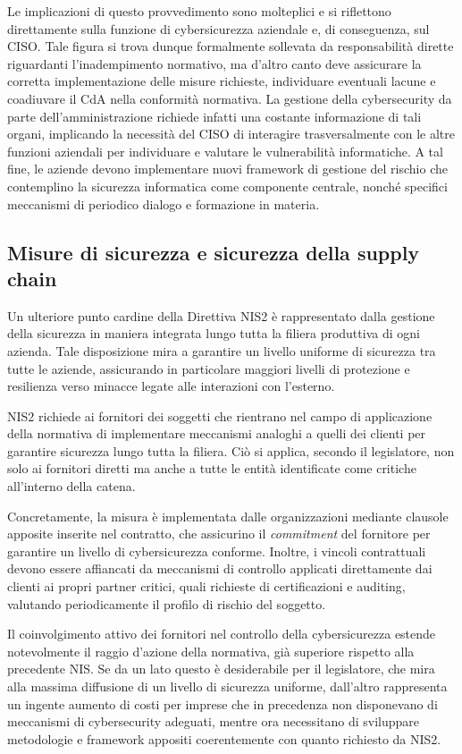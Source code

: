 Le implicazioni di questo provvedimento sono molteplici e si riflettono direttamente sulla funzione
di cybersicurezza aziendale e, di conseguenza, sul CISO. Tale figura si trova dunque formalmente 
sollevata da responsabilità dirette riguardanti l'inadempimento normativo, ma d'altro canto deve
assicurare la corretta implementazione delle misure richieste, individuare eventuali lacune e
coadiuvare il CdA nella conformità normativa. La gestione della cybersecurity
da parte dell'amministrazione richiede infatti una costante informazione di tali organi, implicando la 
necessità del CISO di interagire trasversalmente con le altre funzioni aziendali per individuare e 
valutare le vulnerabilità informatiche. A tal fine, le aziende devono implementare nuovi framework
di gestione del rischio che contemplino la sicurezza informatica come componente centrale, nonché 
specifici meccanismi di periodico dialogo e formazione in materia.


\subsection{Misure di sicurezza e sicurezza della supply chain}
Un ulteriore punto cardine della Direttiva NIS2 è rappresentato dalla gestione della sicurezza in 
maniera integrata lungo tutta la filiera produttiva di ogni azienda. Tale disposizione mira a garantire un livello uniforme di sicurezza tra tutte le aziende, assicurando in particolare
maggiori livelli di protezione e resilienza verso minacce legate alle interazioni con l'esterno.

NIS2 richiede ai fornitori dei soggetti che rientrano nel campo di applicazione della normativa di implementare 
meccanismi analoghi a quelli dei clienti per garantire sicurezza lungo tutta la filiera. Ciò si applica, secondo
il legislatore, non solo ai fornitori diretti ma anche a tutte le entità identificate come critiche all'interno
della catena. 

Concretamente, la misura è implementata dalle organizzazioni mediante clausole apposite inserite nel contratto, 
che assicurino il \textit{commitment} del fornitore per garantire un livello di cybersicurezza conforme. Inoltre,
i vincoli contrattuali devono essere affiancati da meccanismi di controllo applicati direttamente dai clienti
ai propri partner critici, quali richieste di certificazioni e auditing, valutando periodicamente il profilo
di rischio del soggetto.

Il coinvolgimento attivo dei fornitori nel controllo della cybersicurezza estende notevolmente
il raggio d'azione della normativa, già superiore rispetto alla precedente NIS. Se da un lato questo è desiderabile
per il legislatore, che mira alla massima diffusione di un livello di sicurezza uniforme, dall'altro rappresenta
un ingente aumento di costi per imprese che in precedenza non disponevano di meccanismi di cybersecurity adeguati,
mentre ora necessitano di sviluppare metodologie e framework appositi coerentemente con quanto richiesto da NIS2.


